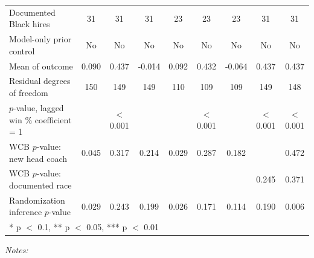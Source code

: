 \begin{table}[!h]
{\begin{threeparttable}
\begin{tabular}[t]{lcccccccc}
Documented Black hires & 31 & 31 & 31 & 23 & 23 & 23 & 31 & 31\\
Model-only prior control & No & No & No & No & No & No & No & No\\
Mean of outcome & 0.090 & 0.437 & -0.014 & 0.092 & 0.432 & -0.064 & 0.437 & 0.437\\
Residual degrees of freedom & 150 & 149 & 149 & 110 & 109 & 109 & 149 & 148\\
$p$-value, lagged win \% coefficient = 1 &  & $<$0.001 &  &  & $<$0.001 &  & $<$0.001 & $<$0.001\\
WCB $p$-value: new head coach & 0.045 & 0.317 & 0.214 & 0.029 & 0.287 & 0.182 &  & 0.472\\
WCB $p$-value: documented race &  &  &  &  &  &  & 0.245 & 0.371\\
Randomization inference $p$-value & 0.029 & 0.243 & 0.199 & 0.026 & 0.171 & 0.114 & 0.190 & 0.006\\
\bottomrule
\multicolumn{9}{l}{\rule{0pt}{1em}* p $<$ 0.1, ** p $<$ 0.05, *** p $<$ 0.01}\\
\end{tabular}
\begin{tablenotes}[para]
\item \textit{Notes:} 

\end{tablenotes}
\end{threeparttable}}
\end{table}
